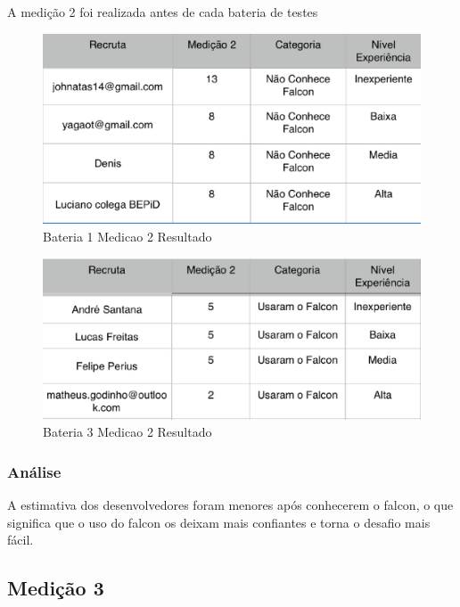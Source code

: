 A medição 2 foi realizada antes de cada bateria de testes


\begin{figure}[H]
  \centering
  \label{fig:indicadores}
  \includegraphics[keepaspectratio=true,scale=0.6]{figuras/Bateria1MEdicao2.eps}
  \caption{Bateria 1 Medicao 2 Resultado}
\end{figure}


\begin{figure}[H]
  \centering
  \label{fig:indicadores}
  \includegraphics[keepaspectratio=true,scale=0.6]{figuras/Bateria3Medicao2.eps}
  \caption{Bateria 3 Medicao 2 Resultado}
\end{figure}



\subsubsection{Análise}
  A estimativa dos desenvolvedores foram menores após conhecerem o falcon, o que significa que o uso do falcon os deixam mais confiantes e torna o desafio mais fácil.



\subsection{Medição 3}

